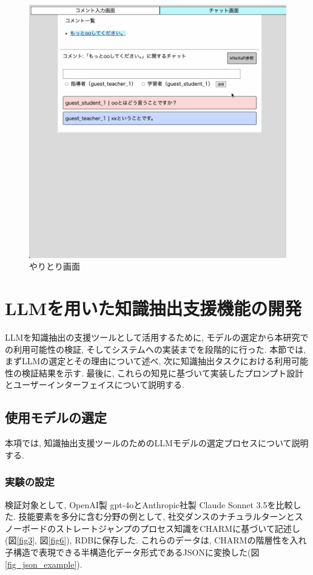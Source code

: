 \begin{figure}[htbp]
    \centering
    \includegraphics[width=1.0\linewidth]{./image/demo_chat.jpg}
    \caption{やりとり画面}
    \label{fig5}
\end{figure}



\section{LLMを用いた知識抽出支援機能の開発}
LLMを知識抽出の支援ツールとして活用するために, モデルの選定から本研究での利用可能性の検証, そしてシステムへの実装までを段階的に行った. 本節では, まずLLMの選定とその理由について述べ, 次に知識抽出タスクにおける利用可能性の検証結果を示す. 最後に, これらの知見に基づいて実装したプロンプト設計とユーザーインターフェイスについて説明する.


\subsection{使用モデルの選定}
本項では, 知識抽出支援ツールのためのLLMモデルの選定プロセスについて説明する. 

\subsubsection{実験の設定}
検証対象として, OpenAI製 gpt-4oとAnthropic社製 Claude Sonnet 3.5を比較した. 技能要素を多分に含む分野の例として, 社交ダンスのナチュラルターンとスノーボードのストレートジャンプのプロセス知識をCHARMに基づいて記述し(図\ref{fig3}, 図\ref{fig6}), RDBに保存した. これらのデータは, CHARMの階層性を入れ子構造で表現できる半構造化データ形式であるJSONに変換した(図\ref{fig_json_example}). 

